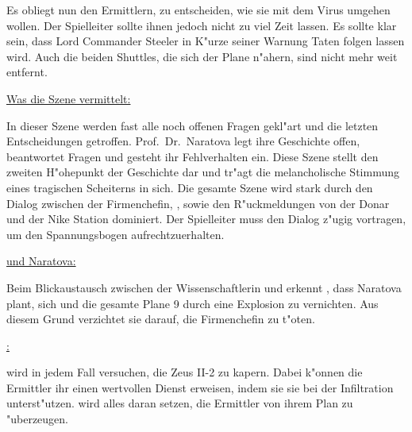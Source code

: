 Es obliegt nun den Ermittlern, zu entscheiden, wie sie mit dem Virus umgehen wollen. Der Spielleiter sollte ihnen jedoch nicht zu viel Zeit lassen. Es sollte klar sein, dass Lord Commander Steeler in K"urze seiner Warnung Taten folgen lassen wird. Auch die beiden Shuttles, die sich der Plane n"ahern, sind nicht mehr weit entfernt.

\begin{remarks}
	\underline{Was die Szene vermittelt:}

	In dieser Szene werden fast alle noch offenen Fragen gekl"art und die letzten Entscheidungen getroffen. Prof.~Dr.~Naratova legt ihre Geschichte offen, beantwortet Fragen und gesteht ihr Fehlverhalten ein. Diese Szene stellt den zweiten H"ohepunkt der Geschichte dar und tr"agt die melancholische Stimmung eines tragischen Scheiterns in sich. Die gesamte Szene wird stark durch den Dialog zwischen der Firmenchefin, \xl{}, \ml{} sowie den R"uckmeldungen von der Donar und der Nike Station dominiert. Der Spielleiter muss den Dialog z"ugig vortragen, um den Spannungsbogen aufrechtzuerhalten.

	\underline{\xl{} und Naratova:}

	Beim Blickaustausch zwischen der Wissenschaftlerin und \xl{} erkennt \xl{}, dass Naratova plant, sich und die gesamte Plane 9 durch eine Explosion zu vernichten. Aus diesem Grund verzichtet sie darauf, die Firmenchefin zu t"oten.

	\underline{\xl{}:}

	\xl{} wird in jedem Fall versuchen, die Zeus II-2 zu kapern. Dabei k"onnen die Ermittler ihr einen wertvollen Dienst erweisen, indem sie sie bei der Infiltration unterst"utzen. \xl{} wird alles daran setzen, die Ermittler von ihrem Plan zu "uberzeugen.
\end{remarks}
\vfill
\newpage

